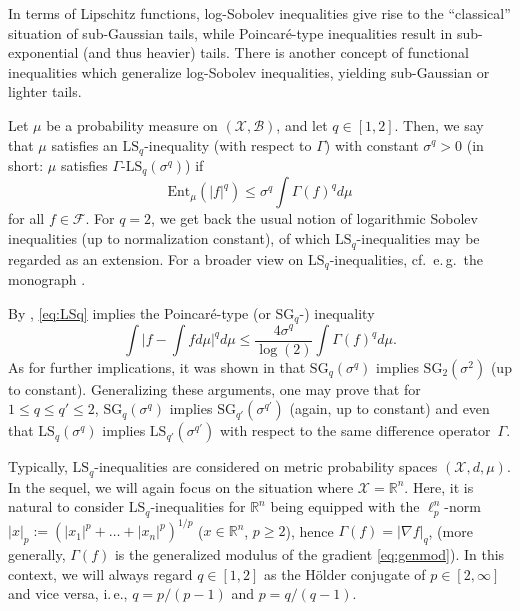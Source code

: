 \documentclass[a4paper,12pt]{amsart}
\numberwithin{equation}{section}
\theoremstyle{remark}
\def\R{{\mathbb R}}
\begin{document}
In terms of Lipschitz functions, log-Sobolev inequalities give rise to the ``classical'' situation of sub-Gaussian tails, while Poincar\'{e}-type inequalities result in sub-exponential (and thus heavier) tails. There is another concept of functional inequalities which generalize log-Sobolev inequalities, yielding sub-Gaussian or lighter tails.

Let $\mu$ be a probability measure on $(\mathcal{X},\mathcal{B})$, and let $q \in [1,2]$. Then, we say that $\mu$ satisfies an $\mathrm{LS}_q$-inequality (with respect to $\Gamma$) with constant $\sigma^q > 0$ (in short: $\mu$ satisfies $\Gamma$-$\mathrm{LS}_q(\sigma^q)$) if
\begin{equation}
	\label{eq:LSq}
	\mathrm{Ent}_{\mu}(|f|^q) \le \sigma^q \int \Gamma(f)^q d\mu
\end{equation}
for all $f \in \mathcal{F}$. For $q=2$, we get back the usual notion of logarithmic Sobolev inequalities (up to normalization constant), of which $\mathrm{LS}_q$-inequalities may be regarded as an extension. For a broader view on $\mathrm{LS}_q$-inequalities, cf.\ e.\,g.\ the monograph \cite{BZ05}.

By \cite[Th.\ 2.1]{BZ05}, \eqref{eq:LSq} implies the Poincar\'{e}-type (or $\mathrm{SG}_q$-) inequality
\begin{equation}\label{eq:SGq}
\int \Big| f - \int f d\mu \Big|^q d\mu \le \frac{4\sigma^q}{\log(2)} \int \Gamma(f)^q d\mu.
\end{equation}
As for further implications, it was shown in \cite[Prop.\ 2.3 \& Cor.\ 2.5]{BZ05} that $\mathrm{SG}_q (\sigma^q)$ implies $\mathrm{SG}_2 (\sigma^2)$ (up to constant). Generalizing these arguments, one may prove that for $1 \le q \le q' \le 2$, $\mathrm{SG}_q(\sigma^q)$ implies $\mathrm{SG}_{q'}(\sigma^{q'})$ (again, up to constant) and even that $\mathrm{LS}_q(\sigma^q)$ implies $\mathrm{LS}_{q'}(\sigma^{q'})$ with respect to the same difference operator~$\Gamma$.

Typically, $\mathrm{LS}_q$-inequalities are considered on metric probability spaces $(\mathcal{X}, d,\mu)$. In the sequel, we will again focus on the situation where $\mathcal{X} = \R^n$. Here, it is natural to consider $\mathrm{LS}_q$-inequalities for $\R^n$ being equipped with the $\ell_p^n$-norm $\lvert x \rvert_p := (|x_1|^p + \ldots + |x_n|^p)^{1/p}$ ($x \in \R^n$, $p \ge 2$), hence $\Gamma(f) = |\nabla f|_q$, (more generally, $\Gamma(f)$ is the generalized modulus of the gradient \eqref{eq:genmod}). In this context, we will always regard $q \in [1,2]$ as the H\"older conjugate of $p \in [2, \infty]$ and vice versa, i.\,e., $q=p/(p-1)$ and $p=q/(q-1)$.
\end{document}

